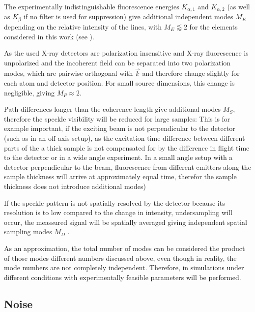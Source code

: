 The experimentally indistinguishable fluorescence energies $K_{\alpha,1}$ and $K_{\alpha,2}$ (as well as  $K_\beta$ if no filter is used for suppression) give additional independent modes $M_E$ depending on the relative intensity of the lines, with $M_E \lessapprox 2$ for the elements considered in this work (see ).

As the used X-ray detectors are polarization insensitive and X-ray fluorescence is unpolarized and the incoherent field can be separated into two polarization modes, which are pairwise orthogonal with $\vec{k}$ and therefore change slightly for each atom and detector position. For small source dimensions, this change is negligible,  giving $M_P \approx 2$. 


Path differences longer than the coherence length give additional modes $M_S$, therefore the speckle visibility will be reduced for large samples:
This is for example important, if the exciting beam is not perpendicular to the detector (such as in an off-axis setup), as the excitation time difference between different parts of the a thick sample is not compensated for by the difference in flight time to the detector or in a wide angle experiment. In a small angle setup with a detector perpendicular to the beam, fluorescence from different emitters along the sample thickness will arrive at approximately equal time, therefor the sample thickness does not introduce additional modes)


If the speckle pattern is not spatially resolved by the detector because its resolution is to low compared to the change in intensity, undersampling will occur, the meassured signal will be spatially averaged giving independent spatial sampling modes $M_D$ \cite{goodman2007}.





As an approximation, the total number of modes can be considered the product of those modes different numbers discussed above, even though in reality, the mode numbers are not completely independent.
Therefore, in   simulations under different conditions with experimentally feasible  parameters will be performed.


\subsection{Noise}

